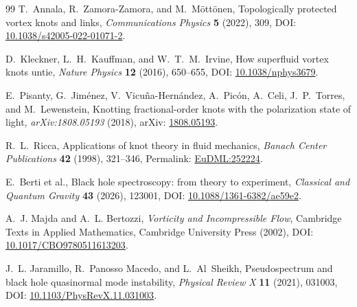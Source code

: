\documentclass[11pt]{article}
\theoremstyle{definition}
\theoremstyle{plain}
\theoremstyle{remark}
\begin{document}
\begin{thebibliography}{99}
            T.~Annala, R.~Zamora-Zamora, and M.~M{\"o}tt{\"o}nen,
            \newblock Topologically protected vortex knots and links,
            \newblock \emph{Communications Physics} \textbf{5} (2022), 309,
            \newblock DOI: \href{https://doi.org/10.1038/s42005-022-01071-2}{10.1038/s42005-022-01071-2}.

            D.~Kleckner, L.~H.~Kauffman, and W.~T.~M.~Irvine,
            \newblock How superfluid vortex knots untie,
            \newblock \emph{Nature Physics} \textbf{12} (2016), 650--655,
            \newblock DOI: \href{https://doi.org/10.1038/nphys3679}{10.1038/nphys3679}.

            E.~Pisanty, G.~Jim{\'e}nez, V.~Vicu{\~n}a-Hern{\'a}ndez, A.~Pic{\'o}n, A.~Celi, J.~P.~Torres, and M.~Lewenstein,
            \newblock Knotting fractional-order knots with the polarization state of light,
            \newblock \emph{arXiv:1808.05193} (2018),
            \newblock arXiv: \href{https://arxiv.org/abs/1808.05193}{1808.05193}.

            R.~L.~Ricca,
            \newblock Applications of knot theory in fluid mechanics,
            \newblock \emph{Banach Center Publications} \textbf{42} (1998), 321--346,
            \newblock Permalink: \href{https://eudml.org/doc/252224}{EuDML:252224}.


            E.~Berti et al.,
            \newblock Black hole spectroscopy: from theory to experiment,
            \newblock \emph{Classical and Quantum Gravity} \textbf{43} (2026), 123001,
            \newblock DOI: \href{https://doi.org/10.1088/1361-6382/ae59e2}{10.1088/1361-6382/ae59e2}.

            A.~J. Majda and A.~L. Bertozzi,
            \newblock \emph{Vorticity and Incompressible Flow},
            \newblock Cambridge Texts in Applied Mathematics, Cambridge University Press (2002),
            \newblock DOI: \href{https://doi.org/10.1017/CBO9780511613203}{10.1017/CBO9780511613203}.

            J.~L. Jaramillo, R.~Panosso Macedo, and L.~Al~Sheikh,
            \newblock Pseudospectrum and black hole quasinormal mode instability,
            \newblock \emph{Physical Review X} \textbf{11} (2021), 031003,
            \newblock DOI: \href{https://doi.org/10.1103/PhysRevX.11.031003}{10.1103/PhysRevX.11.031003}.


\end{thebibliography}
\end{document}
